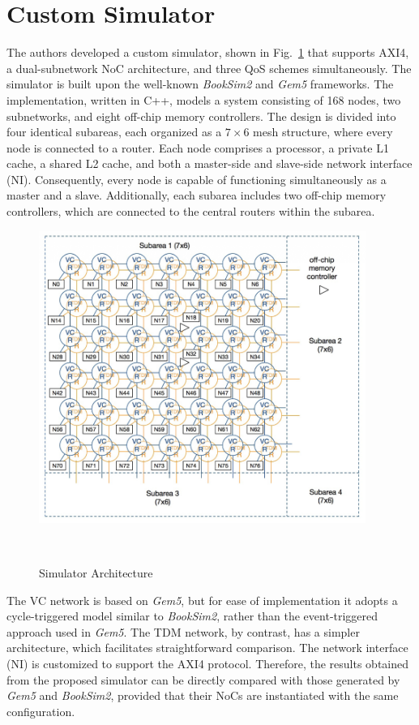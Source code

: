 \section{Custom Simulator}
The authors developed a custom simulator, shown in Fig.~\ref{fig:simulator_architecture} that supports AXI4, a dual-subnetwork NoC architecture, and three QoS schemes simultaneously. The simulator is built upon the well-known \textit{BookSim2} and \textit{Gem5} frameworks.
The implementation, written in C++, models a system consisting of 168 nodes, two subnetworks, and eight off-chip memory controllers. The design is divided into four identical subareas, each organized as a $7 \times 6$ mesh structure, where every node is connected to a router.
Each node comprises a processor, a private L1 cache, a shared L2 cache, and both a master-side and slave-side network interface (NI). Consequently, every node is capable of functioning simultaneously as a master and a slave. Additionally, each subarea includes two off-chip memory controllers, which are connected to the central routers within the subarea.

\begin{figure}[htbp]
    \centering
    \includegraphics[width=0.95\textwidth]{img/Simulator_Architecture.png}
    \caption{Simulator Architecture}~\cite{abderazek_multicore_2013}\label{fig:simulator_architecture}
\end{figure}

The VC network is based on \textit{Gem5}, but for ease of implementation it adopts a cycle-triggered model similar to \textit{BookSim2}, rather than the event-triggered approach used in \textit{Gem5}. The TDM network, by contrast, has a simpler architecture, which facilitates straightforward comparison. 
The network interface (NI) is customized to support the AXI4 protocol. 
Therefore, the results obtained from the proposed simulator can be directly compared with those generated by \textit{Gem5} and \textit{BookSim2}, provided that their NoCs are instantiated with the same configuration.

